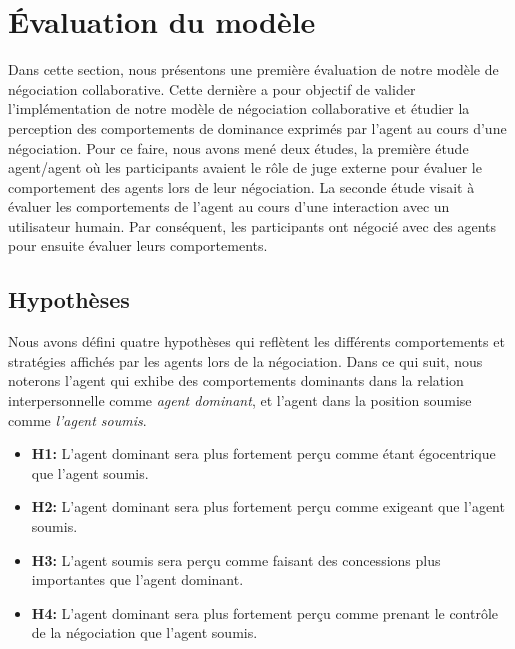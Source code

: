 	\section{Évaluation du modèle}
		
		Dans cette section, nous présentons une première évaluation de notre modèle de négociation collaborative. Cette dernière a pour objectif de valider l'implémentation de notre modèle de négociation collaborative et étudier la perception des comportements de dominance exprimés par l'agent au cours d'une négociation. 
		Pour ce faire, nous avons mené deux études, la première étude agent/agent où les participants avaient le rôle de juge externe pour évaluer le comportement des agents lors de leur négociation.
		La seconde étude visait à évaluer les comportements de l'agent au cours d'une interaction avec un utilisateur humain. Par conséquent, les participants ont négocié avec des agents pour ensuite évaluer leurs comportements. 
		
		\subsection{Hypothèses}
				
				Nous avons défini quatre hypothèses qui reflètent les différents comportements et stratégies affichés par les agents lors de la négociation. Dans ce qui suit, nous noterons l'agent qui exhibe des comportements dominants dans la relation interpersonnelle comme \emph{agent dominant}, et l'agent dans la position soumise comme \emph{l'agent soumis}.
				
				\begin{itemize}
					\item \textbf {H1:} L'agent dominant sera plus fortement perçu comme étant égocentrique que l'agent soumis.
					
					\item \textbf {H2:} L'agent dominant sera plus fortement perçu comme exigeant que l'agent soumis.
					
					\item \textbf {H3:} L'agent soumis sera perçu comme faisant des concessions plus importantes que l'agent dominant.
					
					\item \textbf {H4:} L'agent dominant sera plus fortement perçu comme prenant le contrôle de la négociation que l'agent soumis.
					
				\end{itemize}
				
